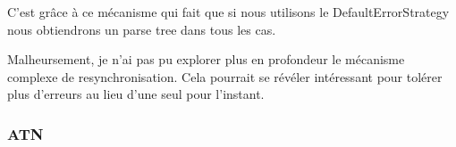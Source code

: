 \documentclass[
    iict, %
    il, %
]{heig-tb}
\begin{document}
C'est grâce à ce mécanisme qui fait que si nous utilisons le DefaultErrorStrategy nous obtiendrons un parse tree dans tous les cas.

Malheursement, je n'ai pas pu explorer plus en profondeur le mécanisme complexe de resynchronisation.
Cela pourrait se révéler intéressant pour tolérer plus d'erreurs au lieu d'une seul pour l'instant.












\subsubsection{ATN}
\end{document}
